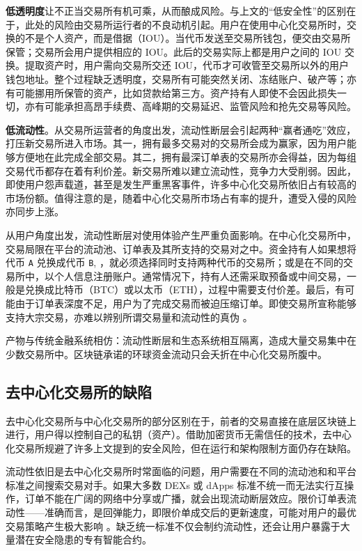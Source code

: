 \documentclass[UTF8,nofonts]{ctexart}%
\begin{document}
\begin{multicols}{2}
\textbf{低透明度}让不正当交易所有机可乘，从而酿成风险。与上文的“低安全性”的区别在于，此处的风险由交易所运行者的不良动机引起。用户在使用中心化交易所时，交换的不是个人资产，而是借据（IOU）。当代币发送至交易所钱包，便交由交易所保管；交易所会用户提供相应的 IOU。此后的交易实际上都是用户之间的 IOU 交换。提取资产时，用户需向交易所交还 IOU，代币才可收管至交易所以外的用户钱包地址。整个过程缺乏透明度，交易所有可能突然关闭、冻结账户、破产等；亦有可能挪用所保管的资产，比如贷款给第三方。资产持有人即使不会因此损失一切，亦有可能承担高昂手续费、高峰期的交易延迟、监管风险和抢先交易等风险。

\textbf{低流动性}。从交易所运营者的角度出发，流动性断层会引起两种“赢者通吃”效应，打压新交易所进入市场。其一，拥有最多交易对的交易所会成为赢家，因为用户能够方便地在此完成全部交易。其二，拥有最深订单表的交易所亦会得益，因为每组交易代币都存在着有利价差。新交易所难以建立流动性，竞争力大受削弱。因此，即使用户怨声载道，甚至是发生严重黑客事件，许多中心化交易所依旧占有较高的市场份额。值得注意的是，随着中心化交易所市场占有率的提升，遭受入侵的风险亦同步上涨。


从用户角度出发，流动性断层对使用体验产生严重负面影响。在中心化交易所中，交易局限在平台的流动池、订单表及其所支持的交易对之中。资金持有人如果想将代币 \verb|A| 兑换成代币 \verb|B|, ，就必须选择同时支持两种代币的交易所；或是在不同的交易所中，以个人信息注册账户。通常情况下，持有人还需采取预备或中间交易，一般是兑换成比特币（BTC）或以太币（ETH），过程中需要支付价差。最后，有可能由于订单表深度不足，用户为了完成交易而被迫压缩订单。即使交易所宣称能够支持大宗交易，亦难以辨别所谓交易量和流动性的真伪 \cite{fakevolume}。

产物与传统金融系统相仿：流动性断层和生态系统相互隔离，造成大量交易集中在少数交易所中。区块链承诺的环球资金流动只会夭折在中心化交易所腹中。

\subsection{去中心化交易所的缺陷}
去中心化交易所与中心化交易所的部分区别在于，前者的交易直接在底层区块链上进行，用户得以控制自己的私钥（资产）。借助加密货币无需信任的技术，去中心化交易所规避了许多上文提到的安全风险，但在运行和架构限制方面仍存在缺陷。

流动性依旧是去中心化交易所时常面临的问题，用户需要在不同的流动池和和平台标准之间搜索交易对手。如果大多数 DEXs 或 dApps 标准不统一而无法实行互操作，订单不能在广阔的网络中分享或广播，就会出现流动断层效应。限价订单表流动性——准确而言，是回弹能力，即限价单成交后的更新速度，可能对用户的最优交易策略产生极大影响 \cite{limitorderliquidity}。缺乏统一标准不仅会制约流动性，还会让用户暴露于大量潜在安全隐患的专有智能合约。


\end{multicols}
\end{document}
